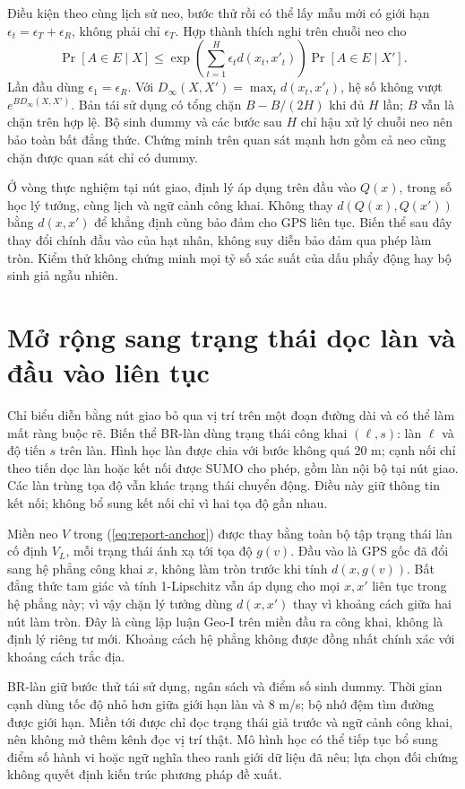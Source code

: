 Điều kiện theo cùng lịch sử neo, bước thử rồi có thể lấy mẫu mới có giới hạn $\epsilon_t=\epsilon_T+\epsilon_R$, không phải chỉ $\epsilon_T$. Hợp thành thích nghi trên chuỗi neo cho
\[
\Pr[A\in E\mid X]\leq
\exp\!\left(\sum_{t=1}^{H}\epsilon_t d(x_t,x'_t)\right)
\Pr[A\in E\mid X'].
\]
Lần đầu dùng $\epsilon_1=\epsilon_R$. Với $D_\infty(X,X')=\max_t d(x_t,x'_t)$, hệ số không vượt $e^{B D_\infty(X,X')}$. Bản tái sử dụng có tổng chặn $B-B/(2H)$ khi đủ $H$ lần; $B$ vẫn là chặn trên hợp lệ. Bộ sinh dummy và các bước sau $H$ chỉ hậu xử lý chuỗi neo nên bảo toàn bất đẳng thức. Chứng minh trên quan sát mạnh hơn gồm cả neo cũng chặn được quan sát chỉ có dummy.

Ở vòng thực nghiệm tại nút giao, định lý áp dụng trên đầu vào $Q(x)$, trong số học lý tưởng, cùng lịch và ngữ cảnh công khai. Không thay $d(Q(x),Q(x'))$ bằng $d(x,x')$ để khẳng định cùng bảo đảm cho GPS liên tục. Biến thể sau đây thay đổi chính đầu vào của hạt nhân, không suy diễn bảo đảm qua phép làm tròn. Kiểm thử không chứng minh mọi tỷ số xác suất của dấu phẩy động hay bộ sinh giả ngẫu nhiên.

\section{Mở rộng sang trạng thái dọc làn và đầu vào liên tục}
\label{sec:lane-method}

Chỉ biểu diễn bằng nút giao bỏ qua vị trí trên một đoạn đường dài và có thể làm mất ràng buộc rẽ. Biến thể BR-làn dùng trạng thái công khai $(\ell,s)$: làn $\ell$ và độ tiến $s$ trên làn. Hình học làn được chia với bước không quá 20 m; cạnh nối chỉ theo tiến dọc làn hoặc kết nối được SUMO cho phép, gồm làn nội bộ tại nút giao. Các làn trùng tọa độ vẫn khác trạng thái chuyển động. Điều này giữ thông tin kết nối; không bổ sung kết nối chỉ vì hai tọa độ gần nhau.

Miền neo $V$ trong (\ref{eq:report-anchor}) được thay bằng toàn bộ tập trạng thái làn cố định $V_L$, mỗi trạng thái ánh xạ tới tọa độ $g(v)$. Đầu vào là GPS gốc đã đổi sang hệ phẳng công khai $x$, không làm tròn trước khi tính $d(x,g(v))$. Bất đẳng thức tam giác và tính 1-Lipschitz vẫn áp dụng cho mọi $x,x'$ liên tục trong hệ phẳng này; vì vậy chặn lý tưởng dùng $d(x,x')$ thay vì khoảng cách giữa hai nút làm tròn. Đây là cùng lập luận Geo-I trên miền đầu ra công khai, không là định lý riêng tư mới. Khoảng cách hệ phẳng không được đồng nhất chính xác với khoảng cách trắc địa.

BR-làn giữ bước thử tái sử dụng, ngân sách và điểm số sinh dummy. Thời gian cạnh dùng tốc độ nhỏ hơn giữa giới hạn làn và 8 m/s; bộ nhớ đệm tìm đường được giới hạn. Miền tới được chỉ đọc trạng thái giả trước và ngữ cảnh công khai, nên không mở thêm kênh đọc vị trí thật. Mô hình học có thể tiếp tục bổ sung điểm số hành vi hoặc ngữ nghĩa theo ranh giới dữ liệu đã nêu; lựa chọn đối chứng không quyết định kiến trúc phương pháp đề xuất.

